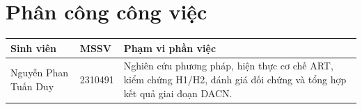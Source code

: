 \chapter*{Phân công công việc}
\begin{table}[htbp]
\centering
\begin{tabularx}{\linewidth}{@{}p{3.3cm}lX@{}}
\toprule
Sinh viên & MSSV & Phạm vi phần việc \\
\midrule
Nguyễn Phan Tuấn Duy & 2310491 & Nghiên cứu phương pháp, hiện thực cơ chế ART, kiểm chứng H1/H2, đánh giá đối chứng và tổng hợp kết quả giai đoạn DACN. \\
\bottomrule
\end{tabularx}
\end{table}
